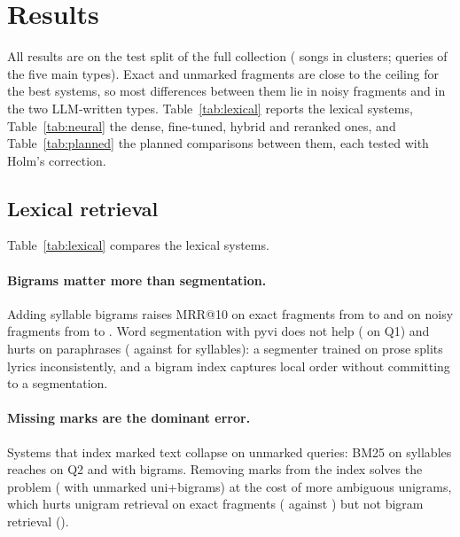 \documentclass[11pt]{article}
\makeatletter
\newcommand{\Qone}{Q1\xspace}
\newcommand{\Qtwo}{Q2\xspace}
\newcommand{\mrr}{MRR@10\xspace}
\makeatother
\begin{document}
\section{Results}\label{sec:results}

All results are on the test split of the full collection (\NSongs{} songs in \NClusters{} clusters;
\NTestQueries{} queries of the five main types). Exact and unmarked fragments are close to the ceiling for
the best systems, so most differences between them lie in noisy fragments and in the two LLM-written types.
Table~\ref{tab:lexical} reports the lexical systems, Table~\ref{tab:neural} the dense, fine-tuned, hybrid and
reranked ones, and Table~\ref{tab:planned} the planned comparisons between them, each tested with Holm's
correction.



\subsection{Lexical retrieval}\label{sec:res_lexical}
Table~\ref{tab:lexical} compares the lexical systems.

\paragraph{Bigrams matter more than segmentation.} Adding syllable bigrams raises \mrr{} on exact fragments
from \MSylOne{} to \MSylBiOne{} and on noisy fragments from \MSylThree{} to \MSylBiThree. Word
segmentation with pyvi does not help (\MWordOne{} on \Qone) and hurts on paraphrases (\MWordFour{} against
\MSylFour{} for syllables): a segmenter trained on prose splits lyrics inconsistently, and a bigram index
captures local order without committing to a segmentation.

\paragraph{Missing marks are the dominant error.} Systems that index marked text collapse on unmarked
queries: BM25 on syllables reaches \MSylTwo{} on \Qtwo{} and \MSylBiTwo{} with bigrams. Removing marks from
the index solves the problem (\MNodiacBiTwo{} with unmarked uni+bigrams) at the cost of more ambiguous
unigrams, which hurts unigram retrieval on exact fragments (\MNodiacOne{} against \MSylOne) but not bigram
retrieval (\MNodiacBiOne).
\end{document}
